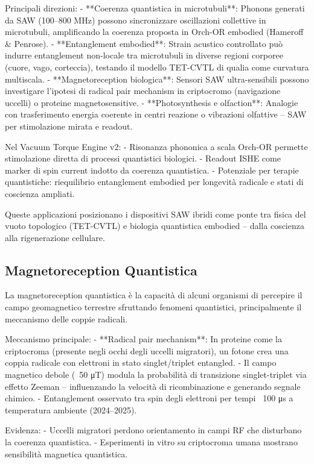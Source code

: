 \documentclass[11pt,a4paper]{article}
\begin{document}
Principali direzioni:
- **Coerenza quantistica in microtubuli**: Phonons generati da SAW (100–800 MHz) possono sincronizzare oscillazioni collettive in microtubuli, amplificando la coerenza proposta in Orch-OR embodied (Hameroff \& Penrose).
- **Entanglement embodied**: Strain acustico controllato può indurre entanglement non-locale tra microtubuli in diverse regioni corporee (cuore, vago, corteccia), testando il modello TET-CVTL di qualia come curvatura multiscala.
- **Magnetoreception biologica**: Sensori SAW ultra-sensibili possono investigare l'ipotesi di radical pair mechanism in criptocromo (navigazione uccelli) o proteine magnetosensitive.
- **Photosynthesis e olfaction**: Analogie con trasferimento energia coerente in centri reazione o vibrazioni olfattive – SAW per stimolazione mirata e readout.

Nel Vacuum Torque Engine v2:
- Risonanza phononica a scala Orch-OR permette stimolazione diretta di processi quantistici biologici.
- Readout ISHE come marker di spin current indotto da coerenza quantistica.
- Potenziale per terapie quantistiche: riequilibrio entanglement embodied per longevità radicale e stati di coscienza ampliati.

Queste applicazioni posizionano i dispositivi SAW ibridi come ponte tra fisica del vuoto topologico (TET-CVTL) e biologia quantistica embodied – dalla coscienza alla rigenerazione cellulare.

\subsection{Magnetoreception Quantistica}

La magnetoreception quantistica è la capacità di alcuni organismi di percepire il campo geomagnetico terrestre sfruttando fenomeni quantistici, principalmente il meccanismo delle coppie radicali.

Meccanismo principale:
- **Radical pair mechanism**: In proteine come la criptocroma (presente negli occhi degli uccelli migratori), un fotone crea una coppia radicale con elettroni in stato singlet/triplet entangled.
- Il campo magnetico debole (~50 μT) modula la probabilità di transizione singlet-triplet via effetto Zeeman – influenzando la velocità di ricombinazione e generando segnale chimico.
- Entanglement osservato tra spin degli elettroni per tempi ~100 μs a temperatura ambiente (2024–2025).

Evidenza:
- Uccelli migratori perdono orientamento in campi RF che disturbano la coerenza quantistica.
- Esperimenti in vitro su criptocroma umana mostrano sensibilità magnetica quantistica.
\end{document}
